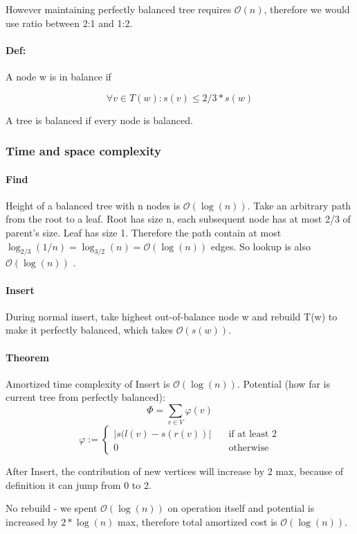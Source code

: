 \documentclass[12pt]{article}
\newcommand{\bigO}{\mathcal{O}}
\begin{document}
However maintaining perfectly balanced tree requires $ \bigO(n) $, therefore we would use ratio between 2:1 and 1:2.
\paragraph{Def:} A node w is in balance if

\[ \forall v \in T(w) : s(v) \leq 2/3 * s(w) \]

A tree is balanced if every node is balanced.

\subsubsection{Time and space complexity}

\paragraph{Find} Height of a balanced tree with n nodes is $ \bigO(\log(n)) $.
Take an arbitrary path from the root to a leaf. Root has size n, each subsequent node has at most 2/3 of parent's size. Leaf has size 1.
Therefore the path contain at most $ \log_{2/3} (1/n) = \log_{3/2}(n) = \bigO(\log(n)) $ edges. So lookup is also $ \bigO(\log(n)) $ .

\paragraph{Insert} During normal insert, take highest out-of-balance node w and rebuild T(w) to make it perfectly balanced, which takes $ \bigO(s(w)) $.

\paragraph{Theorem} Amortized time complexity of Insert is $ \bigO(\log(n)) $.
Potential (how far is current tree from perfectly balanced):
\[ \Phi =  \sum_{v \in V} \varphi(v)\]
\[ \varphi :=
	\begin{cases}
		|  s(l(v) - s(r(v)) | &\quad\text{if at least 2} \\
		\text {0} &\quad\text{otherwise}
	\end{cases}
\]

After Insert, the contribution of new vertices will increase by 2 max, because of definition it can jump from 0 to 2.

No rebuild - we spent $ \bigO(\log(n)) $ on operation itself and potential is increased by $ 2*\log(n) $ max, therefore total amortized cost is $ \bigO(\log(n)) $.
\end{document}
